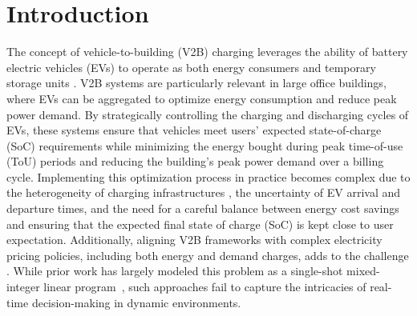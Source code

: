\section{Introduction}
\label{section:introduction}

The concept of vehicle-to-building (V2B)  charging \cite{kempton2005vehicle, lund2008integration} leverages the ability of battery electric vehicles (EVs) to operate as both energy consumers and temporary storage units \cite{tomic2007using}. V2B systems are particularly relevant in large office buildings, where EVs can be aggregated to optimize energy consumption and reduce peak power demand. By strategically controlling the charging and discharging cycles of EVs, these systems ensure that vehicles meet users' expected state-of-charge (SoC) requirements while minimizing the energy bought during peak time-of-use (ToU) periods  \cite{tse2014use, zhao2023research} and reducing the building's peak power demand over a billing cycle.
Implementing this optimization process in practice becomes complex due to the heterogeneity of charging infrastructures \cite{park2024exact}, the uncertainty of EV arrival and departure times, and the need for a careful balance between energy cost savings and ensuring that the expected final state of charge (SoC) is kept close to user expectation.  Additionally, aligning V2B frameworks with complex electricity pricing policies, including both energy and demand charges, adds to the challenge \cite{zhang2018optimal, 8274175}. While prior work has largely modeled this problem as a single-shot mixed-integer linear program~\cite{AORC2013, 5986769, 9409126, MJG2015}, such approaches fail to capture the intricacies of real-time decision-making in dynamic environments.

